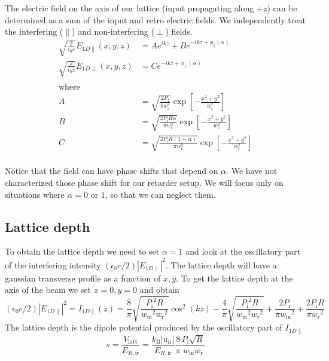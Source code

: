 \documentclass[11pt,letter]{article}
\newcommand{\pin}{\ensuremath{ P_{\text{i}}} }
\newcommand{\win}{\ensuremath{ w_{\text{in}}} }
\newcommand{\wret}{\ensuremath{ w_{\text{r}}} }
\begin{document}
The electric field on the axis of our lattice (input propagating along $+z$)
can be determined as a sum of the input and retro electric fields.  We
independently treat the interfering ($\parallel$) and non-interfering ($\perp$)
fields.  
\begin{equation}
\begin{split}
  \sqrt{\frac{2}{\epsilon_{0}c}}  
   E_{1D\parallel}(x,y,z) & = Ae^{ik z} + Be^{-ikz + \phi_{\parallel}(\alpha)} \\
  \sqrt{\frac{2}{\epsilon_{0}c}}  
  E_{1D\perp}(x,y,z) & = Ce^{-ikz + \phi_{\perp}(\alpha)} \\
   & \\ 
 \text{where}  \ \ \ \ \ \ \ \ \ \ \ \ \ \ \ \  & \\
   A & = \sqrt{ \frac{2\pin }{\pi w_{\text{i}}^{2} } } 
         \exp\left[ -\frac{ x^{2} + y^{2} }{w_{\text{i}}^{2}}\right]\\ 
   B & = \sqrt{ \frac{2\pin  R \alpha}{\pi w_{\text{r}}^{2} } } 
         \exp\left[ -\frac{ x^{2} + y^{2} }{w_{\text{r}}^{2}}\right]\\ 
   C & = \sqrt{ \frac{2\pin  R  (1-\alpha)}{\pi w_{\text{r}}^{2} } } 
         \exp\left[ -\frac{ x^{2} + y^{2} }{w_{\text{r}}^{2}}\right]\\ 
\end{split}
\end{equation}

Notice that the field can have phase shifts that depend on $\alpha$.  We have
not characterized those phase shift for our retarder setup.  We will focus only
on situations where $\alpha=0$ or $1$,  so that we can neglect them.    


\subsection{Lattice depth}

To obtain the lattice depth we need to set $\alpha=1$ and look at the
oscillatory part of the interfering intensity
$(\epsilon_{0}c/2)|E_{1D\parallel}|^{2}$.  The lattice depth will have a
gaussian transverse profile as a function of $x,y$.  To get the lattice depth
at the axis of the beam we set $x=0,y=0$ and obtain
\begin{equation}
  (\epsilon_{0}c/2)|E_{1D\parallel}|^{2} = I_{1D\parallel}(z) =
  \frac{8}{\pi}  
   \sqrt{ \frac{ \pin^{2} R }{ \win^{2} \wret^{2}} } 
 \cos ^2\left(k z\right)
  - \frac{4}{\pi} \sqrt{ \frac{ \pin^{2}R }{ \win^{2}\wret^{2} }} 
+\frac{2 \pin }{\pi  \win^{2} }
+\frac{2 \pin R}{\pi  \wret^{2} }
\end{equation}
The lattice depth is the dipole potential produced by the oscillatory part of
$I_{1D\parallel}$
\begin{equation}
  s = 
  \frac{V_{\text{latt}}}{E_{R,\text{ir}}}  = 
  \frac{ k_{\text{B}} |u_{\text{ir}}| }{E_{R,\text{ir}}}
  \frac{8}{\pi}  
    \frac{ \pin \sqrt{ R } }{ \win \wret} 
\end{equation}
\end{document}
